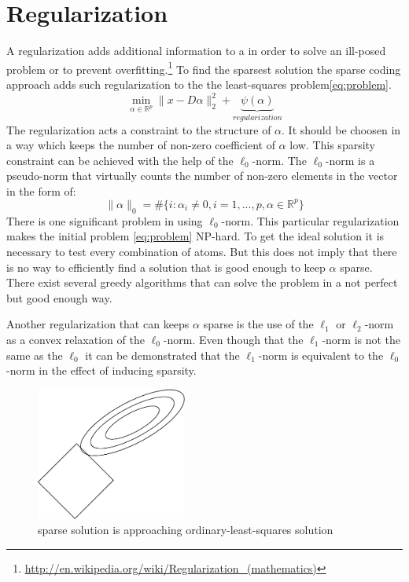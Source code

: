 \section{Regularization}
A regularization adds additional information to a in order to solve an
ill-posed problem or to prevent
overfitting.\footnote{\url{
http://en.wikipedia.org/wiki/Regularization_(mathematics)}}
To find the sparsest solution the sparse coding approach adds such
regularization to the the least-squares problem\ref{eq:problem}. 
\begin{equation}
\min_{\alpha\in\mathbb{R}^{p}} \lVert x - D\alpha \rVert^{2}_{2} +
\underbrace{\psi(\alpha)}_{regularization}
\end{equation}
The regularization acts a constraint to the structure of $\alpha$. It should be
choosen in a way which keeps the number of non-zero coefficient of $\alpha$ low.
This sparsity constraint can be achieved with the help of the $\ell_0$-norm.
The $\ell_0$-norm is a pseudo-norm that virtually counts the number of non-zero
elements in the vector in the form of:
\begin{equation}
\lVert\alpha\rVert_{0} = \#\{i:\alpha_i \neq 
0,i=1,...,p,\alpha\in\mathbb{R}^p\} 
\end{equation}
There is one significant problem in using $\ell_0$-norm. This particular
regularization makes the initial problem \ref{eq:problem} NP-hard. To get the
ideal solution it is necessary to test every combination of atoms. But this
does not imply that there is no way to efficiently find a solution that is good
enough to keep $\alpha$ sparse. There exist several greedy algorithms that can
solve the problem in a not perfect but good enough way. 

Another regularization that can keeps $\alpha$ sparse is the use of the $\ell_1$
or $\ell_2$-norm as a convex relaxation of the $\ell_0$-norm. Even though that
the $\ell_1$-norm is not the same as the $\ell_0$ it can be demonstrated that
the $\ell_1$-norm is equivalent to the $\ell_0$-norm in the effect of inducing
sparsity.
\begin{figure}[h]
\centering
\includegraphics[width = 0.44\textwidth]{images/regularization.pdf}
\caption{sparse solution is approaching ordinary-least-squares solution}
\label{fig:sparse}
\end{figure}


